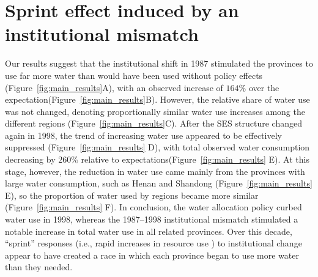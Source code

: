 \documentclass{article}
\begin{document}
\section{Sprint effect induced by an institutional mismatch}
Our results suggest that the institutional shift in 1987 stimulated the provinces to use far more water than would have been used without policy effects (Figure~\ref{fig:main_results}A), with an observed increase of $164\%$ over the expectation(Figure~\ref{fig:main_results}B).
However, the relative share of water use was not changed, denoting proportionally similar water use increases among the different regions (Figure~\ref{fig:main_results}C).
After the SES structure changed again in 1998, the trend of increasing water use appeared to be effectively suppressed (Figure~\ref{fig:main_results} D), with total observed water consumption decreasing by $260\%$ relative to expectations(Figure~\ref{fig:main_results} E).
At this stage, however, the reduction in water use came mainly from the provinces with large water consumption, such as Henan and Shandong (Figure~\ref{fig:main_results} E),  so the proportion of water used by regions became more similar (Figure~\ref{fig:main_results} F).
In conclusion, the water allocation policy curbed water use in 1998, whereas the 1987–1998 institutional mismatch stimulated a notable increase in total water use in all related provinces.
Over this decade, “sprint” responses (i.e., rapid increases in resource use \cite{lueckPreemptiveHabitatDestruction2003}) to institutional change appear to have created a race in which each province began to use more water than they needed.
\end{document}

